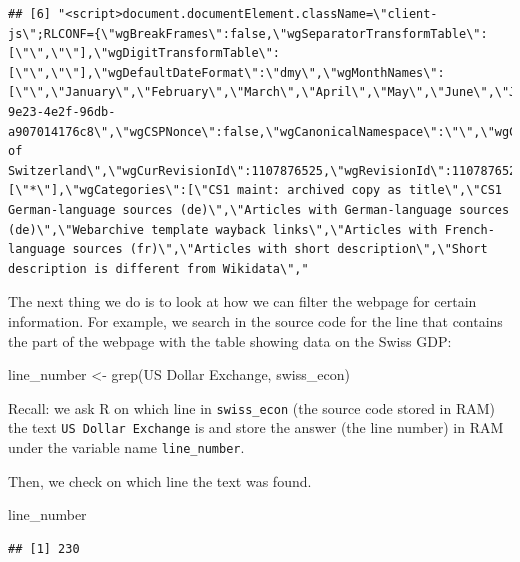 \documentclass[
  12pt,
]{style/krantz}
\newenvironment{Shaded}{\begin{snugshade}}{\end{snugshade}}
\newcommand{\FunctionTok}[1]{\textcolor[rgb]{0.00,0.00,0.00}{#1}}
\newcommand{\NormalTok}[1]{#1}
\newcommand{\OtherTok}[1]{\textcolor[rgb]{0.56,0.35,0.01}{#1}}
\newcommand{\StringTok}[1]{\textcolor[rgb]{0.31,0.60,0.02}{#1}}
\begin{document}
\begin{verbatim}
## [6] "<script>document.documentElement.className=\"client-js\";RLCONF={\"wgBreakFrames\":false,\"wgSeparatorTransformTable\":[\"\",\"\"],\"wgDigitTransformTable\":[\"\",\"\"],\"wgDefaultDateFormat\":\"dmy\",\"wgMonthNames\":[\"\",\"January\",\"February\",\"March\",\"April\",\"May\",\"June\",\"July\",\"August\",\"September\",\"October\",\"November\",\"December\"],\"wgRequestId\":\"d8acd662-9e23-4e2f-96db-a907014176c8\",\"wgCSPNonce\":false,\"wgCanonicalNamespace\":\"\",\"wgCanonicalSpecialPageName\":false,\"wgNamespaceNumber\":0,\"wgPageName\":\"Economy_of_Switzerland\",\"wgTitle\":\"Economy of Switzerland\",\"wgCurRevisionId\":1107876525,\"wgRevisionId\":1107876525,\"wgArticleId\":27465,\"wgIsArticle\":true,\"wgIsRedirect\":false,\"wgAction\":\"view\",\"wgUserName\":null,\"wgUserGroups\":[\"*\"],\"wgCategories\":[\"CS1 maint: archived copy as title\",\"CS1 German-language sources (de)\",\"Articles with German-language sources (de)\",\"Webarchive template wayback links\",\"Articles with French-language sources (fr)\",\"Articles with short description\",\"Short description is different from Wikidata\","
\end{verbatim}

The next thing we do is to look at how we can filter the webpage for certain information. For example, we search in the source code for the line that contains the part of the webpage with the table showing data on the Swiss GDP:

\begin{Shaded}
\begin{Highlighting}[]
\NormalTok{line\_number }\OtherTok{\textless{}{-}} \FunctionTok{grep}\NormalTok{(}\StringTok{\textquotesingle{}US Dollar Exchange\textquotesingle{}}\NormalTok{, swiss\_econ)}
\end{Highlighting}
\end{Shaded}

Recall: we ask R on which line in \texttt{swiss\_econ} (the source code stored in RAM) the text \texttt{US\ Dollar\ Exchange} is and store the answer (the line number) in RAM under the variable name \texttt{line\_number}.

Then, we check on which line the text was found.

\begin{Shaded}
\begin{Highlighting}[]
\NormalTok{line\_number}
\end{Highlighting}
\end{Shaded}

\begin{verbatim}
## [1] 230
\end{verbatim}
\end{document}
